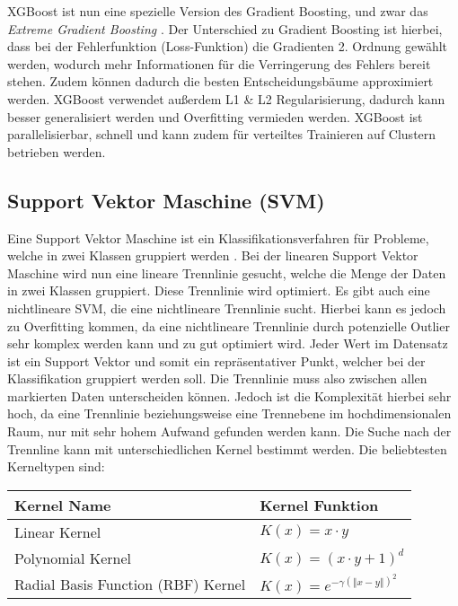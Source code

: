 XGBoost ist nun eine spezielle Version des Gradient Boosting, und zwar das \textit{Extreme Gradient Boosting} \cite{chenXGBoostScalableTree2016}.
Der Unterschied zu Gradient Boosting ist hierbei, dass bei der Fehlerfunktion (Loss-Funktion) die Gradienten 2. Ordnung gewählt werden, wodurch mehr Informationen für die Verringerung des Fehlers bereit stehen.
Zudem können dadurch die besten Entscheidungsbäume approximiert werden. 
XGBoost verwendet außerdem L1 \& L2 Regularisierung, dadurch kann besser generalisiert werden und Overfitting vermieden werden.
XGBoost ist parallelisierbar, schnell und kann zudem für verteiltes Trainieren auf Clustern betrieben werden.

\subsection{Support Vektor Maschine (SVM)}
\label{ch:Basics:se:ml:ss:svm}
Eine Support Vektor Maschine ist ein Klassifikationsverfahren für Probleme, welche in zwei Klassen gruppiert werden \cite{cortesSupportvectorNetworks1995}.
Bei der linearen Support Vektor Maschine wird nun eine lineare {\glqq Trennlinie\grqq} gesucht, welche die Menge der Daten in zwei Klassen gruppiert. 
Diese Trennlinie wird optimiert.
Es gibt auch eine nichtlineare SVM, die eine nichtlineare Trennlinie sucht.
Hierbei kann es jedoch zu Overfitting kommen, da eine nichtlineare Trennlinie durch potenzielle Outlier sehr komplex werden kann und zu {\glqq gut\grqq} optimiert wird.
Jeder Wert im Datensatz ist ein Support Vektor und somit ein repräsentativer Punkt, welcher bei der Klassifikation gruppiert werden soll.
Die Trennlinie muss also zwischen allen markierten Daten unterscheiden können.
Jedoch ist die Komplexität hierbei sehr hoch, da eine Trennlinie beziehungsweise eine Trennebene im hochdimensionalen Raum, nur mit sehr hohem Aufwand gefunden werden kann.
Die Suche nach der Trennline kann mit unterschiedlichen Kernel bestimmt werden.
Die beliebtesten Kerneltypen sind:

\begin{center}
    \begin{tabular}{ | l | l | }
        \hline
        Kernel Name & Kernel Funktion \\ \hline
        Linear Kernel & $K(x)=x \cdot y$ \\ 
        Polynomial Kernel & $K(x)=(x\cdot y+1)^d$ \\
        Radial Basis Function (RBF) Kernel & $K(x)=e^{-\gamma(\Vert x-y \Vert)^2}$ \\
        \hline
    \end{tabular}
\end{center}

